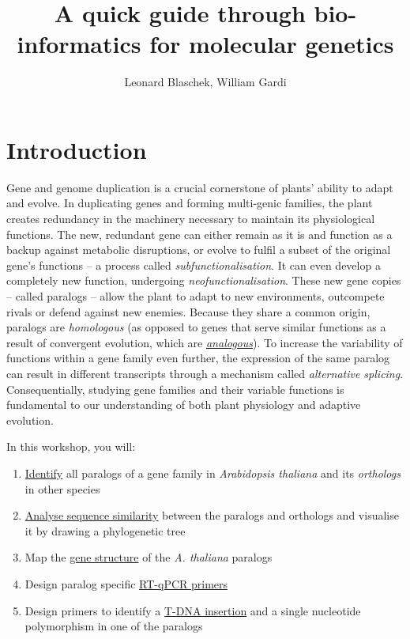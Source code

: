\documentclass[11pt]{article}
\title{A quick guide through bio-informatics for molecular genetics}
\author{Leonard Blaschek, William Gardi}
\begin{document}
 	\maketitle
 	
 	\section*{Introduction}
 	
 	Gene and genome duplication is a crucial cornerstone of plants' ability to adapt and evolve.
 	In duplicating genes and forming multi-genic families, the plant creates redundancy in the machinery necessary to maintain its physiological functions. 
 	The new, redundant gene can either remain as it is and function as a backup against metabolic disruptions, or evolve to fulfil a subset of the original gene's functions --  a process called \textit{subfunctionalisation}.
 	It can even develop a completely new function, undergoing \textit{neofunctionalisation}.
 	These new gene copies -- called paralogs -- allow the plant to adapt to new environments, outcompete rivals or defend against new enemies.
 	Because they share a common origin, paralogs are \textit{homologous} (as opposed to genes that serve similar functions as a result of convergent evolution, which are \href{https://evolution.berkeley.edu/evolibrary/article/evo_09}{\textit{analogous}}).
 	To increase the variability of functions within a gene family even further, the expression of the same paralog can result in different transcripts through a mechanism called \textit{alternative splicing}.
 	Consequentially, studying gene families and their variable functions is fundamental to our understanding of both plant physiology and adaptive evolution.
 	
 	\vspace*{1em}
 	
 	In this workshop, you will:
 	\begin{enumerate}
 		\item \hyperref[sec:find]{Identify} all paralogs of a gene family in \textit{Arabidopsis thaliana} and its \textit{orthologs} in other species
 		\item \hyperref[sec:phylo]{Analyse sequence similarity} between the paralogs and orthologs and visualise it by drawing a phylogenetic tree
 		\item Map the \hyperref[sec:str]{gene structure} of the \textit{A. thaliana} paralogs
 		\item Design paralog specific \hyperref[sec:qpcr]{RT-qPCR primers}
 		\item Design primers to identify a \hyperref[sec:mut]{T-DNA insertion} and a single nucleotide polymorphism in one of the paralogs
 	\end{enumerate}
 
\end{document}
